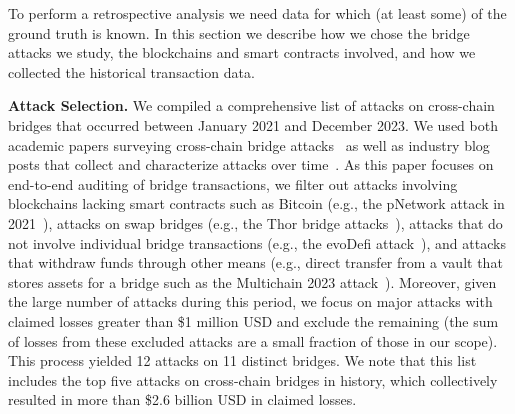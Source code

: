 
To perform a retrospective analysis we need data for which (at
least some) of the ground truth is known.   In this section we
describe how we chose the bridge attacks we study, the blockchains and
smart contracts involved, and how we collected the historical
transaction data.

\textbf{Attack Selection.}
%
We compiled a comprehensive list of attacks on cross-chain
bridges that occurred between January 2021 and December 2023.  We used both academic papers surveying cross-chain
bridge attacks~\cite{lee2023sok, zhang2023sok, zhao2023comprehensive} as well
as industry blog posts that collect and characterize attacks over time~\cite{GithubBridgeBugTracker, SlowMistHackedBridges:online,
  REKTDB:online, Web3Great:online, GithubBridgeHacks2:online}. 
As this paper focuses on end-to-end auditing of bridge transactions, we filter out attacks
involving blockchains lacking smart contracts such
as Bitcoin (e.g., the pNetwork attack in 2021~\cite{pNetworkhack:online}), attacks on swap bridges (e.g., the Thor bridge attacks~\cite{Thorhack1:online,Thorhack2:online}), attacks that do not involve individual bridge transactions (e.g., the evoDefi attack~\cite{evoDefihack:online}),
and attacks that withdraw funds through other means (e.g., direct transfer from a vault that stores assets for a bridge such as the Multichain 2023 attack~\cite{Multichainhack:online}).  Moreover, given the large number of attacks during this period, we focus on
major attacks with claimed losses greater than \$1 million USD and
exclude the remaining (the sum of losses from these excluded attacks are a small fraction of those in our scope).
%
%
This process yielded 12 attacks on 11 distinct bridges.
We note that this list
includes the top five attacks on cross-chain bridges in history, which
collectively resulted in more than \$2.6 billion USD in claimed losses.

